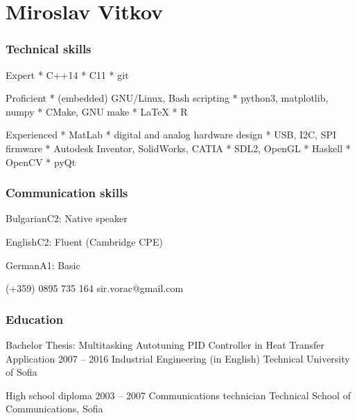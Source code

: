\documentclass{tccv}
\begin{document}
\part{Miroslav Vitkov}


\section{Technical skills}
\begin{factlist}
\item{Expert}
{
     * C++14 \mynext
     * C11   \mynext
     * git
}
\\
\item{Proficient}
{
    * (embedded) GNU/Linux, Bash scripting    \mynext
    * python3, matplotlib, numpy              \mynext
    * CMake, GNU make                         \mynext
    * \LaTeX                                  \mynext
    * R
}
\\
\item{Experienced}
{
    * MatLab                                       \mynext
    * digital and analog hardware design           \mynext
    * USB, I2C, SPI firmware                       \mynext
    * Autodesk Inventor, SolidWorks, CATIA         \mynext
    * SDL2, OpenGL                                 \mynext
    * Haskell                                      \mynext
    * OpenCV                                       \mynext
    * pyQt
}
\end{factlist}


\section{Communication skills}
\begin{factlist}
\item{Bulgarian}{C2: Native speaker}
\item{English}{C2: Fluent (Cambridge CPE)}
\item{German}{A1: Basic}
\end{factlist}


\personal
    {}
    {(+359) 0895 735 164}
    {sir.vorac@gmail.com}


\section{Education}
\begin{yearlist}
\item[Bachelor Thesis:                 \newline
     {\footnotesize Multitasking Autotuning PID Controller in Heat Transfer Application}]
     {2007 -- 2016}
     {Industrial Engineering (in English)}
     {Technical University of Sofia}

\item[High school diploma]{2003 -- 2007}
     {Communications technician}
     {Technical School of Communications, Sofia}
\end{yearlist}
\end{document}

